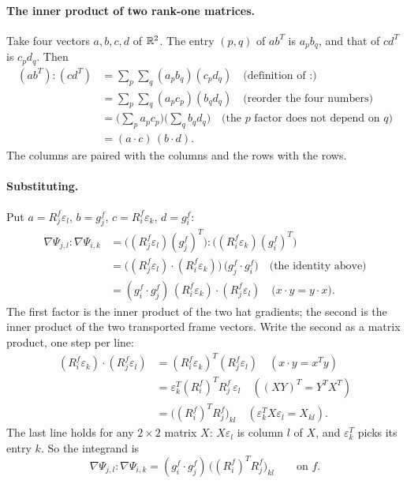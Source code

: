 \paragraph{The inner product of two rank-one matrices.} Take four vectors $a, b, c, d$ of $\mathbb{R}^2$. The entry $(p, q)$ of $a b^T$ is $a_p b_q$, and that of $c d^T$ is $c_p d_q$. Then
\begin{align*}
(a b^T) : (c d^T) &= \sum_{p}\sum_{q} (a_p b_q)(c_p d_q) \quad \text{(definition of $:$)}\\
&= \sum_{p}\sum_{q} (a_p c_p)(b_q d_q) \quad \text{(reorder the four numbers)}\\
&= \Big(\sum_{p} a_p c_p\Big)\Big(\sum_{q} b_q d_q\Big) \quad \text{(the $p$ factor does not depend on $q$)}\\
&= (a \cdot c)\,(b \cdot d) .
\end{align*}
The columns are paired with the columns and the rows with the rows.

\paragraph{Substituting.} Put $a = R_j^f\varepsilon_l$, $b = g_j^f$, $c = R_i^f\varepsilon_k$, $d = g_i^f$:
\begin{align*}
\nabla \Psi_{j,l} : \nabla \Psi_{i,k} &= \big( (R_j^f \varepsilon_l) (g_j^f)^T \big) : \big( (R_i^f \varepsilon_k) (g_i^f)^T \big) \\
&= \big((R_j^f \varepsilon_l)\cdot(R_i^f \varepsilon_k)\big)\,\big(g_j^f\cdot g_i^f\big) \quad \text{(the identity above)}\\
&= (g_i^f \cdot g_j^f)\, (R_i^f \varepsilon_k) \cdot (R_j^f \varepsilon_l) \quad \text{($x\cdot y = y\cdot x$)} .
\end{align*}
The first factor is the inner product of the two hat gradients; the second is the inner product of the two transported frame vectors. Write the second as a matrix product, one step per line:
\begin{align*}
(R_i^f \varepsilon_k) \cdot (R_j^f \varepsilon_l) &= (R_i^f \varepsilon_k)^T (R_j^f \varepsilon_l) \quad (x\cdot y = x^Ty)\\
&= \varepsilon_k^T (R_i^f)^T R_j^f\, \varepsilon_l \quad ((XY)^T = Y^TX^T)\\
&= \big((R_i^f)^T R_j^f\big)_{kl} \quad (\varepsilon_k^T X \varepsilon_l = X_{kl}) .
\end{align*}
The last line holds for any $2\times 2$ matrix $X$: $X\varepsilon_l$ is column $l$ of $X$, and $\varepsilon_k^T$ picks its entry $k$. So the integrand is
\begin{equation*}
\nabla \Psi_{j,l} : \nabla \Psi_{i,k} = (g_i^f \cdot g_j^f)\,\big((R_i^f)^T R_j^f\big)_{kl} \qquad \text{on } f .
\end{equation*}

